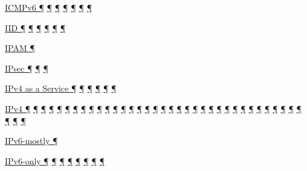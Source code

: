 \documentclass[
]{article}
\begin{document}
\hyperref[address-resolution]{ICMPv6 ¶} \hyperref[auto-configuration]{¶}
\hyperref[extension-headers-and-options]{¶}
\hyperref[dual-stack-scenarios]{¶}
\hyperref[translation-and-ipv4-as-a-service]{¶} \hyperref[security]{¶}
\hyperref[filtering]{¶}

\hyperref[addresses]{IID ¶}
\hyperref[ipv6-primary-differences-from-ipv4]{¶}
\hyperref[translation-and-ipv4-as-a-service]{¶}
\hyperref[layer-2-considerations]{¶}
\hyperref[multi-prefix-operation]{¶} \hyperref[multihoming]{¶}

\hyperref[address-and-prefix-management]{IPAM ¶}

\hyperref[extension-headers-and-options]{IPsec ¶}
\hyperref[packet-format]{¶} \hyperref[security]{¶}

\hyperref[coexistence-with-legacy-ipv4]{IPv4 as a Service ¶}
\hyperref[dual-stack-scenarios]{¶}
\hyperref[translation-and-ipv4-as-a-service]{¶}
\hyperref[network-design]{¶} \hyperref[multihoming]{¶}
\hyperref[deployment-in-the-home]{¶}

\hyperref[how-a-network-operations-center-sees-ipv6]{IPv4 ¶}
\hyperref[how-an-application-programmer-sees-ipv6]{¶}
\hyperref[why-version-6]{¶} \hyperref[obsolete-features-in-ipv6]{¶}
\hyperref[address-resolution]{¶} \hyperref[addresses]{¶}
\hyperref[dns]{¶} \hyperref[extension-headers-and-options]{¶}
\hyperref[layer-2-functions]{¶} \hyperref[managed-configuration]{¶}
\hyperref[routing]{¶}
\hyperref[source-and-destination-address-selection]{¶}
\hyperref[traffic-class-and-flow-label]{¶}
\hyperref[transport-protocols]{¶} \hyperref[further-reading]{¶}
\hyperref[coexistence-with-legacy-ipv4]{¶}
\hyperref[dual-stack-scenarios]{¶}
\hyperref[ipv6-primary-differences-from-ipv4]{¶}
\hyperref[obsolete-techniques]{¶}
\hyperref[translation-and-ipv4-as-a-service]{¶} \hyperref[tunnels]{¶}
\hyperref[security]{¶} \hyperref[filtering]{¶}
\hyperref[layer-2-considerations]{¶} \hyperref[topology-obfuscation]{¶}
\hyperref[network-design]{¶} \hyperref[address-planning]{¶}
\hyperref[address-and-prefix-management]{¶}
\hyperref[benchmarking-and-monitoring]{¶}
\hyperref[energy-consumption]{¶} \hyperref[multi-prefix-operation]{¶}
\hyperref[multihoming]{¶} \hyperref[packet-size-and-jumbo-frames]{¶}
\hyperref[cern-and-the-lhc]{¶} \hyperref[deployment-by-carriers]{¶}
\hyperref[deployment-in-the-home]{¶} \hyperref[status]{¶}
\hyperref[tools]{¶}

\hyperref[dual-stack-scenarios]{IPv6-mostly ¶}

\hyperref[routing]{IPv6-only ¶}
\hyperref[source-and-destination-address-selection]{¶}
\hyperref[coexistence-with-legacy-ipv4]{¶}
\hyperref[dual-stack-scenarios]{¶}
\hyperref[translation-and-ipv4-as-a-service]{¶} \hyperref[tunnels]{¶}
\hyperref[security]{¶} \hyperref[deployment-by-carriers]{¶}
\end{document}
